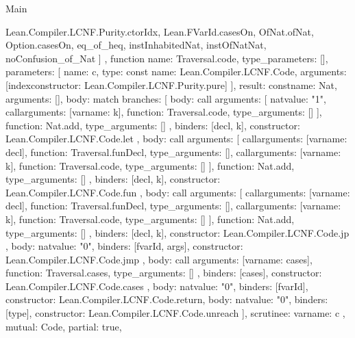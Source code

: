 \begin{lexlean}{Main}
\begin{toolingmodule}
{{        Lean.Compiler.LCNF.Purity.ctorIdx,
        Lean.FVarId.casesOn,
        OfNat.ofNat,
        Option.casesOn,
        eq_of_heq,
        instInhabitedNat,
        instOfNatNat,
        noConfusion_of_Nat
      ]
    },
    function{
      name: Traversal.code,
      type_parameters: [],
      parameters: [
        {
          name: c,
          type: const{
            name: Lean.Compiler.LCNF.Code,
            arguments: [index{constructor: Lean.Compiler.LCNF.Purity.pure}]
          }
        }
      ],
      result: const{name: Nat, arguments: []},
      body: match{
        branches: [
          {
            body: call{
              arguments: [
                nat{value: "1"},
                call{arguments: [var{name: k}], function: Traversal.code, type_arguments: []}
              ],
              function: Nat.add,
              type_arguments: []
            },
            binders: [decl, k],
            constructor: Lean.Compiler.LCNF.Code.let
          },
          {
            body: call{
              arguments: [
                call{arguments: [var{name: decl}], function: Traversal.funDecl, type_arguments: []},
                call{arguments: [var{name: k}], function: Traversal.code, type_arguments: []}
              ],
              function: Nat.add,
              type_arguments: []
            },
            binders: [decl, k],
            constructor: Lean.Compiler.LCNF.Code.fun
          },
          {
            body: call{
              arguments: [
                call{arguments: [var{name: decl}], function: Traversal.funDecl, type_arguments: []},
                call{arguments: [var{name: k}], function: Traversal.code, type_arguments: []}
              ],
              function: Nat.add,
              type_arguments: []
            },
            binders: [decl, k],
            constructor: Lean.Compiler.LCNF.Code.jp
          },
          {
            body: nat{value: "0"},
            binders: [fvarId, args],
            constructor: Lean.Compiler.LCNF.Code.jmp
          },
          {
            body: call{
              arguments: [var{name: cases}],
              function: Traversal.cases,
              type_arguments: []
            },
            binders: [cases],
            constructor: Lean.Compiler.LCNF.Code.cases
          },
          {body: nat{value: "0"}, binders: [fvarId], constructor: Lean.Compiler.LCNF.Code.return},
          {body: nat{value: "0"}, binders: [type], constructor: Lean.Compiler.LCNF.Code.unreach}
        ],
        scrutinee: var{name: c}
      },
      mutual: Code,
      partial: true,
}}
\end{toolingmodule}
\end{lexlean}
